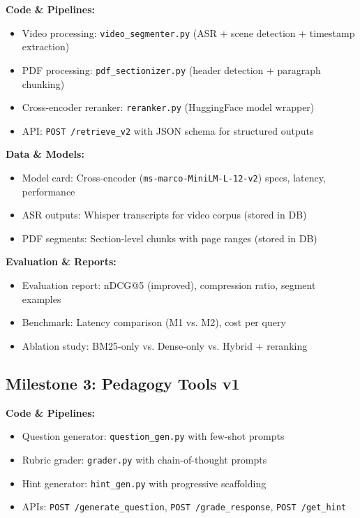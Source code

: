 \documentclass[11pt,letterpaper]{article}
\begin{document}
\textbf{Code \& Pipelines:}
\begin{itemize}
\item Video processing: \texttt{video\_segmenter.py} (ASR + scene detection + timestamp extraction)
\item PDF processing: \texttt{pdf\_sectionizer.py} (header detection + paragraph chunking)
\item Cross-encoder reranker: \texttt{reranker.py} (HuggingFace model wrapper)
\item API: \texttt{POST /retrieve\_v2} with JSON schema for structured outputs
\end{itemize}

\textbf{Data \& Models:}
\begin{itemize}
\item Model card: Cross-encoder (\texttt{ms-marco-MiniLM-L-12-v2}) specs, latency, performance
\item ASR outputs: Whisper transcripts for video corpus (stored in DB)
\item PDF segments: Section-level chunks with page ranges (stored in DB)
\end{itemize}

\textbf{Evaluation \& Reports:}
\begin{itemize}
\item Evaluation report: nDCG@5 (improved), compression ratio, segment examples
\item Benchmark: Latency comparison (M1 vs. M2), cost per query
\item Ablation study: BM25-only vs. Dense-only vs. Hybrid + reranking
\end{itemize}

\subsection{Milestone 3: Pedagogy Tools v1}

\textbf{Code \& Pipelines:}
\begin{itemize}
\item Question generator: \texttt{question\_gen.py} with few-shot prompts
\item Rubric grader: \texttt{grader.py} with chain-of-thought prompts
\item Hint generator: \texttt{hint\_gen.py} with progressive scaffolding
\item APIs: \texttt{POST /generate\_question}, \texttt{POST /grade\_response}, \texttt{POST /get\_hint}
\end{itemize}
\end{document}
